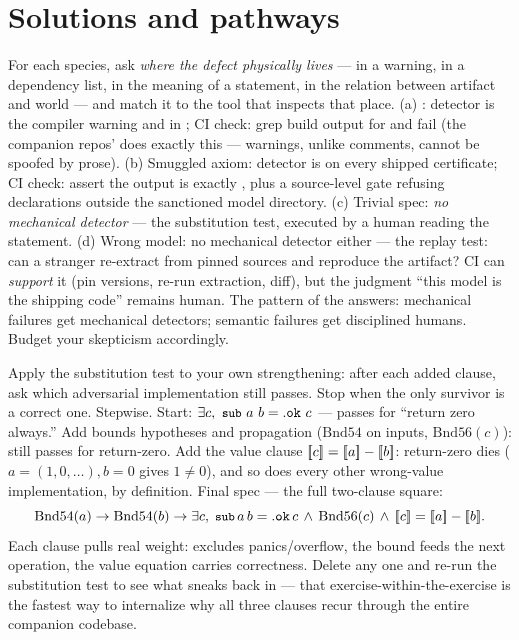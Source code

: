\section*{Solutions and pathways}
\solutionsintro

\pathway For each species, ask \emph{where the defect physically lives}
--- in a warning, in a dependency list, in the meaning of a statement, in
the relation between artifact and world --- and match it to the tool that
inspects that place.
\answer (a) : detector is the compiler warning and
 in ; CI check: grep build output for
 and fail (the companion repos'  does
exactly this --- warnings, unlike comments, cannot be spoofed by prose).
(b) Smuggled axiom: detector is  on every shipped
certificate; CI check: assert the output is exactly
, plus a source-level gate
refusing  declarations outside the sanctioned model
directory. (c) Trivial spec: \emph{no mechanical detector} --- the
substitution test, executed by a human reading the statement. (d) Wrong
model: no mechanical detector either --- the replay test: can a stranger
re-extract from pinned sources and reproduce the artifact? CI can
\emph{support} it (pin versions, re-run extraction, diff), but the
judgment ``this model is the shipping code'' remains human. The pattern
of the answers: mechanical failures get mechanical detectors; semantic
failures get disciplined humans. Budget your skepticism accordingly.

\pathway Apply the substitution test to your own strengthening: after
each added clause, ask which adversarial implementation still passes.
Stop when the only survivor is a correct one.
\answer Stepwise. Start:
$\exists c,\ \code{sub}\ a\ b = \mathtt{.ok}\ c$ --- passes for
``return zero always.'' Add bounds hypotheses and propagation
($\mathrm{Bnd54}$ on inputs, $\mathrm{Bnd56}(c)$): still passes for
return-zero. Add the value clause
$[\mkern-3.3mu[ c ]\mkern-3.3mu] = [\mkern-3.3mu[ a ]\mkern-3.3mu] - [\mkern-3.3mu[ b ]\mkern-3.3mu]$: return-zero dies
($a = (1,0,\dots), b = 0$ gives $1 \neq 0$), and so does every other
wrong-value implementation, by definition. Final spec --- the full
two-clause square:
\[
\mathrm{Bnd54}(a) \to \mathrm{Bnd54}(b) \to \exists c,\;
\code{sub}\,a\,b = \mathtt{.ok}\,c \,\wedge\, \mathrm{Bnd56}(c)
\,\wedge\, \denote{c} = \denote{a} - \denote{b}.
\]
Each clause pulls real weight:  excludes panics/overflow, the
bound feeds the next operation, the value equation carries correctness.
Delete any one and re-run the substitution test to see what sneaks back
in --- that exercise-within-the-exercise is the fastest way to internalize
why all three clauses recur through the entire companion codebase.

